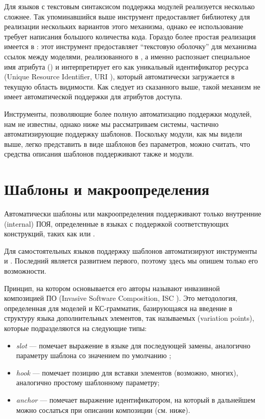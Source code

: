 Для языков с текстовым синтаксисом поддержка модулей реализуется несколько сложнее. Так упоминавшийся выше инструмент  \cite{???} предоставляет библиотеку для реализации нескольких вариантов этого механизма, однако ее использование требует написания большого количества кода. Гораздо более простая реализация имеется в  \cite{???}: этот инструмент предоставляет ``текстовую оболочку'' для механизма ссылок между моделями, реализованного в , а именно распознает специальное имя атрибута () и интерпретирует его как уникальный идентификатор ресурса (Unique Resource Identifier, URI \cite{???}), который автоматически загружается в текущую область видимости. Как следует из сказанного выше, такой механизм не имеет автоматической поддержки для атрибутов доступа.

Инструменты, позволяющие более полную автоматизацию поддержки модулей, нам не известны, однако ниже мы рассматриваем системы, частично автоматизирующие поддержку шаблонов. Поскольку модули, как мы видели выше, легко представить в виде шаблонов без параметров, можно считать, что средства описания шаблонов поддерживают также и модули.

\section{Шаблоны и макроопределения}

Автоматически шаблоны или макроопределения поддерживают только внутренние (internal) ПОЯ, определенные в языках с поддержкой соответствующих конструкций, таких как  или .

Для самостоятельных языков поддержку шаблонов автоматизируют инструменты  \cite{???} и  \cite{???}. Последний является развитием первого, поэтому здесь мы опишем только его возможности.
 
Принцип, на котором основывается  его авторы называют инвазивной композицией ПО (Invasive Software Composition, ISC \cite{???}). Это методология, определенная для моделей и КС-грамматик, базирующаяся на введение в структуру языка дополнительных элементов, так называемых  (variation points), которые подразделяются на следующие типы:
\begin{itemize}
\item \emph{slot} --- помечает выражение в языке для последующей замены, аналогично параметру шаблона со значением по умолчанию \cite{Cpp};
\item \emph{hook} --- помечает позицию для вставки элементов (возможно, многих), аналогично простому шаблонному параметру;
\item \emph{anchor} --- помечает выражение идентификатором, на который в дальнейшем можно сослаться при описании композиции (см. ниже).
\end{itemize}

